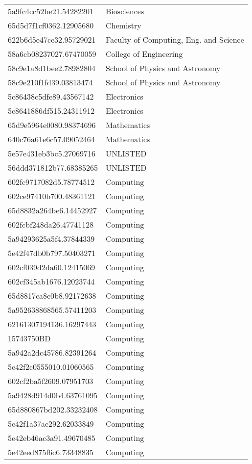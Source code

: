 \begin{tabular}{ll}
5a9fc4cc52be21.54282201 & Biosciences \\
65d5d7f1cf0362.12905680 & Chemistry \\
622b6d5e47ce32.95729021 & Faculty of Computing, Eng. and Science \\
58a6cb08237027.67470059 & College of Engineering \\
58c9e1a8d1bee2.78982804 & School of Physics and Astronomy \\
58c9e210f1fd39.03813474 & School of Physics and Astronomy \\
5c86438c5dfe89.43567142 & Electronics \\
5c8641886df515.24311912 & Electronics \\
65d9e5964e0080.98374696 & Mathematics \\
640c76a61e6c57.09052464 & Mathematics \\
5e57e431eb3bc5.27069716 & UNLISTED \\
56ddd371812b77.68385265 & UNLISTED \\
602fc9717082d5.78774512 & Computing \\
602ce97410b700.48361121 & Computing \\
65d8832a264be6.14452927 & Computing \\
602fcbf248da26.47741128 & Computing \\
5a94293625a5f4.37844339 & Computing \\
5e42f47db0b797.50403271 & Computing \\
602cf039d2da60.12415069 & Computing \\
602cf345ab1676.12023744 & Computing \\
65d8817ca8c0b8.92172638 & Computing \\
5a952638868565.57411203 & Computing \\
62161307194136.16297443 & Computing \\
15743750BD & Computing \\
5a942a2dc45786.82391264 & Computing \\
5e42f2c0555010.01060565 & Computing \\
602cf2ba5f2609.07951703 & Computing \\
5a9428d914d0b4.63761095 & Computing \\
65d880867bd202.33232408 & Computing \\
5e42f1a37ac292.62033849 & Computing \\
5e42eb46ac3a91.49670485 & Computing \\
5e42eed875f6c6.73348835 & Computing \\

\end{tabular}
